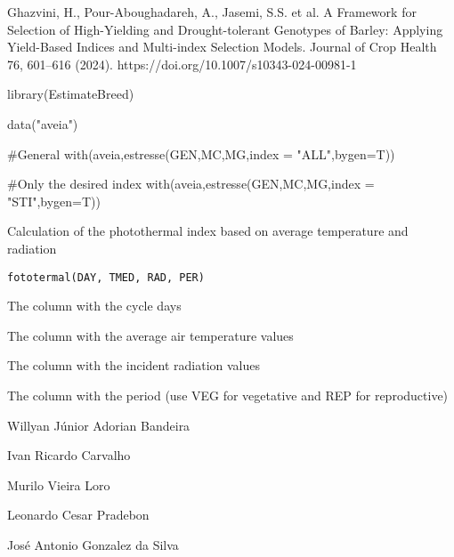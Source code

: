 \documentclass[a4paper]{book}
\begin{document}
%
\begin{References}
Ghazvini, H., Pour-Aboughadareh, A., Jasemi, S.S. et al.
A Framework for Selection of High-Yielding and Drought-tolerant
Genotypes of Barley: Applying Yield-Based Indices and Multi-index
Selection Models. Journal of Crop Health 76, 601–616 (2024).
https://doi.org/10.1007/s10343-024-00981-1
\end{References}
%
\begin{Examples}
\begin{ExampleCode}

library(EstimateBreed)

data("aveia")

#General
with(aveia,estresse(GEN,MC,MG,index = "ALL",bygen=T))

#Only the desired index
with(aveia,estresse(GEN,MC,MG,index = "STI",bygen=T))

\end{ExampleCode}
\end{Examples}
%
\begin{Description}
Calculation of the photothermal index based on average temperature and
radiation
\end{Description}
%
\begin{Usage}
\begin{verbatim}
fototermal(DAY, TMED, RAD, PER)
\end{verbatim}
\end{Usage}
%
\begin{Arguments}
\begin{ldescription}
\item[\code{DAY}] The column with the cycle days

\item[\code{TMED}] The column with the average air temperature values

\item[\code{RAD}] The column with the incident radiation values

\item[\code{PER}] The column with the period (use VEG for vegetative and REP for
reproductive)
\end{ldescription}
\end{Arguments}
%
\begin{Author}
Willyan Júnior Adorian Bandeira

Ivan Ricardo Carvalho

Murilo Vieira Loro

Leonardo Cesar Pradebon

José Antonio Gonzalez da Silva
\end{Author}
\end{document}
